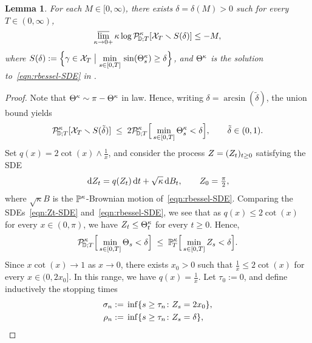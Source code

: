 \documentclass[a4paper, 11pt]{article}
\newtheorem{lem}[thm]{Lemma}
\theoremstyle{definition}
\numberwithin{equation}{section}
\numberwithin{figure}{section}
\renewcommand{\limsup}{\varlimsup}
\newcommand{\rbessel}[1][]{{\ifx&#1&\else{_{#1}}\fi}\Theta^{\kappa}}
\newcommand{\Zprocess}[1][]{{\ifx&#1&\else{^{#1 \!}}\fi}Z}
\newcommand{\Dpaths}[1][]{\cX_{#1}}
\newcommand{\rDmeasure}[2][]{\mathcal{P}^{#2}_{\!\bD;#1}}
\newcommand{\BMmeasure}[2][]{\bP^{#2}_{\!#1}}
\newcommand{\condbig}{\;\big|\;}
\begin{document}
\begin{lem}\label{thm:radial-harmonic-measure-gets-small-estimate}
For each $M \in [0,\infty)$, there exists $\delta = \delta(M) > 0$ such for every $T \in (0,\infty)$, 
\begin{align} \label{eq:bound_proba_S}
\limsup_{\kappa \to 0+}\kappa\log\rDmeasure[T]{\kappa}[\Dpaths[T] \smallsetminus S(\delta)] \le -M ,
\end{align} 
where
$S(\delta) := \Big\{\gamma \in \Dpaths[T] \condbig\underset{s \in [0,T]}{\min} \, \sin(\rbessel_s) \ge \delta \Big\}$, 
and $\rbessel$ is the solution to~\eqref{eqn:rbessel-SDE} in . 
\end{lem}


\begin{proof}
Note that $\rbessel \sim \pi-\rbessel$ in law. Hence, writing $\delta = \arcsin(\tilde\delta)$, the union bound yields
\begin{align}\label{eqn:sintheta-theta-estimate}
\rDmeasure[T]{\kappa} [\Dpaths[T] \smallsetminus S(\tilde\delta)] 
\; \le \; 2 \rDmeasure[T]{\kappa} \Big[\min_{s \in [0,T]}\rbessel_s < \delta\Big] ,
\qquad \tilde\delta \in (0,1) .
\end{align}
Set $q(x) = 2\cot(x) \wedge \frac{1}{x}$, and consider the process $Z = (\Zprocess_t)_{t \ge 0}$ satisfying the SDE
\begin{align}\label{eqn:Zt-SDE}
\ud \Zprocess_t = q(\Zprocess_t) \ud t + \sqrt{\kappa} \ud B_t, \qquad \Zprocess_0 = \tfrac{\pi}{2},
\end{align}
where $\sqrt{\kappa}B$ is the $\BMmeasure{\kappa}$-Brownian motion of~\eqref{eqn:rbessel-SDE}. 
Comparing the SDEs~\eqref{eqn:Zt-SDE} and~\eqref{eqn:rbessel-SDE}, 
we see that as $q(x) \le 2\cot(x)$ for every $x \in (0,\pi)$, 
we have $\Zprocess_t \le \rbessel_t$ for every $t \ge 0$.
Hence, 
\begin{align*}
\rDmeasure[T]{\kappa} \Big[\min_{s \in [0,T]} \Theta_s < \delta\Big] 
\; \le \; \BMmeasure[T]{\kappa}\Big[\min_{s \in [0,T]} \Zprocess_s < \delta\Big] .
\end{align*}
Since $x \cot(x) \to 1$ as $x \to 0$, 
there exists $x_0 > 0$ such that $\frac{1}{x} \le 2\cot(x)$ for every $x \in (0,2 x_0]$. 
In this range, we have $q(x) = \frac{1}{x}$. 
Let $\tau_0 := 0$, and define 
inductively the stopping times
\begin{align*}
\sigma_{n} :=\;& \inf\{s \ge \tau_n \colon \Zprocess_{s} = 2x_0\},\\
\rho_{n} :=\;& \inf\{s \ge \tau_n \colon \Zprocess_{s} = \delta\}, \\

\end{align*}
\end{proof}
\end{document}
